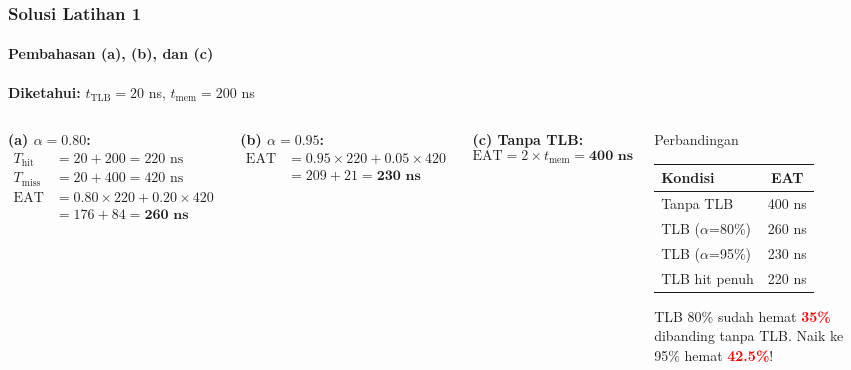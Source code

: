 \documentclass[t,aspectratio=169,xcolor=dvipsnames]{beamer}
\newcommand{\tem}[1]{\textbf{\textcolor{red}{#1}}}
\begin{document}
\begin{frame}
    \frametitle{Solusi Latihan 1}
    \framesubtitle{Pembahasan (a), (b), dan (c)}
    \footnotesize

    \textbf{Diketahui:} $t_{\text{TLB}} = 20$ ns, $t_{\text{mem}} = 200$ ns

    \vspace{0.1cm}
    \begin{columns}[T]
        \textbf{(a) $\alpha = 0.80$:}
        \begin{align*}
            T_{\text{hit}}  &= 20 + 200 = 220 \text{ ns}\\
            T_{\text{miss}} &= 20 + 400 = 420 \text{ ns}\\
            \text{EAT} &= 0.80 \times 220 + 0.20 \times 420\\
                       &= 176 + 84 = \mathbf{260 \text{ ns}}
        \end{align*}

        \textbf{(b) $\alpha = 0.95$:}
        \begin{align*}
            \text{EAT} &= 0.95 \times 220 + 0.05 \times 420\\
                       &= 209 + 21 = \mathbf{230 \text{ ns}}
        \end{align*}

        \textbf{(c) Tanpa TLB:}
        \[ \text{EAT} = 2 \times t_{\text{mem}} = \mathbf{400 \text{ ns}} \]

        \begin{exampleblock}{Perbandingan}
            \begin{tabular}{lc}
                \hline
                \textbf{Kondisi} & \textbf{EAT} \\
                \hline
                Tanpa TLB       & 400 ns \\
                TLB ($\alpha$=80\%) & 260 ns \\
                TLB ($\alpha$=95\%) & 230 ns \\
                TLB hit penuh   & 220 ns \\
                \hline
            \end{tabular}

            \vspace{0.15cm}
            TLB 80\% sudah hemat \tem{35\%} dibanding tanpa TLB. Naik ke 95\% hemat \tem{42.5\%}!
        \end{exampleblock}
    \end{columns}
\end{frame}
\end{document}
